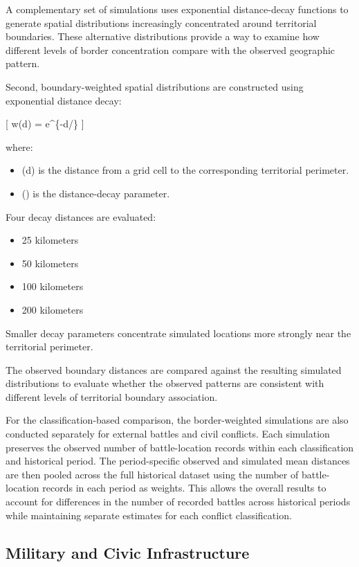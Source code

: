 \documentclass[
  letterpaper,
  DIV=11,
  numbers=noendperiod]{scrartcl}
\providecommand{\tightlist}{%
  \setlength{\itemsep}{0pt}\setlength{\parskip}{0pt}}\usepackage{longtable,booktabs,array}
\begin{document}
A complementary set of simulations uses exponential distance-decay
functions to generate spatial distributions increasingly concentrated
around territorial boundaries. These alternative distributions provide a
way to examine how different levels of border concentration compare with
the observed geographic pattern.

Second, boundary-weighted spatial distributions are constructed using
exponential distance decay:

{[} w(d) = e\^{}\{-d/\lambda\} {]}

where:

\begin{itemize}
\tightlist
\item
  (d) is the distance from a grid cell to the corresponding territorial
  perimeter.
\item
  (\lambda) is the distance-decay parameter.
\end{itemize}

Four decay distances are evaluated:

\begin{itemize}
\tightlist
\item
  25 kilometers
\item
  50 kilometers
\item
  100 kilometers
\item
  200 kilometers
\end{itemize}

Smaller decay parameters concentrate simulated locations more strongly
near the territorial perimeter.

The observed boundary distances are compared against the resulting
simulated distributions to evaluate whether the observed patterns are
consistent with different levels of territorial boundary association.

For the classification-based comparison, the border-weighted simulations
are also conducted separately for external battles and civil conflicts.
Each simulation preserves the observed number of battle-location records
within each classification and historical period. The period-specific
observed and simulated mean distances are then pooled across the full
historical dataset using the number of battle-location records in each
period as weights. This allows the overall results to account for
differences in the number of recorded battles across historical periods
while maintaining separate estimates for each conflict classification.

\subsection{Military and Civic
Infrastructure}\label{military-and-civic-infrastructure}
\end{document}
